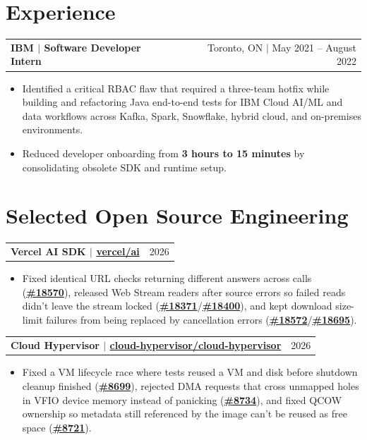 \documentclass[letterpaper,11pt]{article}
\makeatletter
\newcommand{\resumeHeadingSimple}[2]{%
  \begin{tabularx}{\textwidth}{@{}Xr@{}}
    \textbf{#1} & #2
  \end{tabularx}\vspace{-1pt}
}
\newcommand{\resumeItemListStart}{\begin{itemize}[leftmargin=0.23in,itemsep=0.4pt,parsep=0pt,topsep=0.5pt]}
\newcommand{\resumeItem}[1]{\item\fontsize{10.2pt}{11.5pt}\selectfont #1}
\newcommand{\resumeItemListEnd}{\end{itemize}\vspace{-1.25pt}}
\makeatother
\begin{document}
\section{Experience}
\resumeHeadingSimple
  {IBM $|$ Software Developer Intern}
  {Toronto, ON $|$ May 2021 -- August 2022}
\resumeItemListStart
  \resumeItem{Identified a critical RBAC flaw that required a three-team hotfix while building and refactoring Java end-to-end tests for IBM Cloud AI/ML and data workflows across Kafka, Spark, Snowflake, hybrid cloud, and on-premises environments.}
  \resumeItem{Reduced developer onboarding from \textbf{3 hours to 15 minutes} by consolidating obsolete SDK and runtime setup.}
\resumeItemListEnd

\section{Selected Open Source Engineering}

\resumeHeadingSimple
  {Vercel AI SDK $|$ \href{https://redirect.github.com/vercel/ai}{vercel/ai}}
  {2026}
\resumeItemListStart
  \resumeItem{Fixed identical URL checks returning different answers across calls (\href{https://redirect.github.com/vercel/ai/pull/18570}{\textbf{\#18570}}), released Web Stream readers after source errors so failed reads didn't leave the stream locked (\href{https://redirect.github.com/vercel/ai/pull/18371}{\textbf{\#18371}}/\href{https://redirect.github.com/vercel/ai/pull/18400}{\textbf{\#18400}}), and kept download size-limit failures from being replaced by cancellation errors (\href{https://redirect.github.com/vercel/ai/pull/18572}{\textbf{\#18572}}/\href{https://redirect.github.com/vercel/ai/pull/18695}{\textbf{\#18695}}).}
\resumeItemListEnd

\resumeHeadingSimple
  {Cloud Hypervisor $|$ \href{https://redirect.github.com/cloud-hypervisor/cloud-hypervisor}{cloud-hypervisor/cloud-hypervisor}}
  {2026}
\resumeItemListStart
  \resumeItem{Fixed a VM lifecycle race where tests reused a VM and disk before shutdown cleanup finished (\href{https://redirect.github.com/cloud-hypervisor/cloud-hypervisor/pull/8699}{\textbf{\#8699}}), rejected DMA requests that cross unmapped holes in VFIO device memory instead of panicking (\href{https://redirect.github.com/cloud-hypervisor/cloud-hypervisor/pull/8734}{\textbf{\#8734}}), and fixed QCOW ownership so metadata still referenced by the image can't be reused as free space (\href{https://redirect.github.com/cloud-hypervisor/cloud-hypervisor/pull/8721}{\textbf{\#8721}}).}
\resumeItemListEnd
\end{document}
